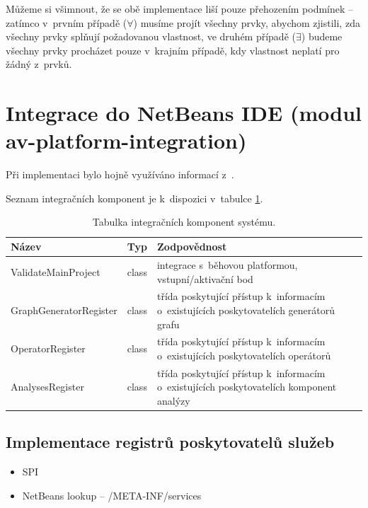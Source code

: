 Můžeme si všimnout, že se obě implementace liší pouze přehozením podmínek -- zatímco v~prvním případě ($\forall$) musíme projít všechny prvky, abychom zjistili, zda všechny prvky splňují požadovanou vlastnost, ve druhém případě ($\exists$) budeme všechny prvky procházet pouze v~krajním případě, kdy vlastnost neplatí pro žádný z~prvků.

\section{Integrace do NetBeans IDE (modul av-platform-integration)}

Při implementaci bylo hojně využíváno informací z~\cite{netbeans_platform}.

Seznam integračních komponent je k~dispozici v~tabulce \ref{implementation-integration_components}.

\begin{table}
  \caption{Tabulka integračních komponent systému. \label{implementation-integration_components}}
  \begin{center}
    \begin{tabular}{ | l | l | p{8cm} | }
      \hline
      \textbf{Název} & \textbf{Typ} & \textbf{Zodpovědnost} \\
      \hline
      \hline
      ValidateMainProject & class & integrace s~běhovou platformou, vstupní/aktivační bod \\ \hline
      GraphGeneratorRegister & class & třída poskytující přístup k~informacím o~existujících poskytovatelích generátorů grafu \\ \hline
      OperatorRegister & class & třída poskytující přístup k~informacím o~existujících poskytovatelích operátorů \\ \hline
      AnalysesRegister & class & třída poskytující přístup k~informacím o~existujících poskytovatelích komponent analýzy \\ \hline
    \end{tabular}
  \end{center}
\end{table}

\subsection{Implementace registrů poskytovatelů služeb}
\begin{itemize}
\item SPI
\item NetBeans lookup -- /META-INF/services
\end{itemize}

